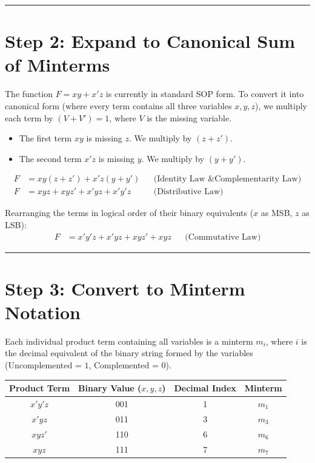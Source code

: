 \documentclass[12pt,a3paper]{article}
\begin{document}
\begin{enumerate}
\begin{tcolorbox}[enhanced,breakable,ansbox,colback=cB!4,colframe=cB,boxrule=0.8pt,arc=5pt,title={\textbf{Answer}},fonttitle=\bfseries\color{white},colbacktitle=cB]
\vspace{0.2cm}
\hrule
\vspace{0.4cm}

\section*{Step 2: Expand to Canonical Sum of Minterms}

The function $F = xy + x'z$ is currently in standard SOP form. To convert it into canonical form (where every term contains all three variables $x, y, z$), we multiply each term by $(V + V') = 1$, where $V$ is the missing variable.

\begin{itemize}
    \item The first term $xy$ is missing $z$. We multiply by $(z + z')$.
    \item The second term $x'z$ is missing $y$. We multiply by $(y + y')$.
\end{itemize}

\begin{align*}
    F &= xy(z + z') + x'z(y + y') && \text{(Identity Law \& Complementarity Law)} \\
    F &= xyz + xyz' + x'yz + x'y'z && \text{(Distributive Law)}
\end{align*}

Rearranging the terms in logical order of their binary equivalents ($x$ as MSB, $z$ as LSB):
\begin{align*}
    F &= x'y'z + x'yz + xyz' + xyz && \text{(Commutative Law)}
\end{align*}

\vspace{0.2cm}
\hrule
\vspace{0.4cm}

\section*{Step 3: Convert to Minterm Notation}

Each individual product term containing all variables is a minterm $m_i$, where $i$ is the decimal equivalent of the binary string formed by the variables (Uncomplemented = $1$, Complemented = $0$).

\begin{center}
\renewcommand{\arraystretch}{1.3}
\begin{tabular}{c c c c}
    \toprule
    \textbf{Product Term} & \textbf{Binary Value ($x, y, z$)} & \textbf{Decimal Index} & \textbf{Minterm} \\
    \midrule
    $x'y'z$ & 001 & 1 & $m_1$ \\
    $x'yz$ & 011 & 3 & $m_3$ \\
    $xyz'$ & 110 & 6 & $m_6$ \\
    $xyz$ & 111 & 7 & $m_7$ \\
    \bottomrule
\end{tabular}
\end{center}


\end{tcolorbox}
\end{enumerate}
\end{document}
